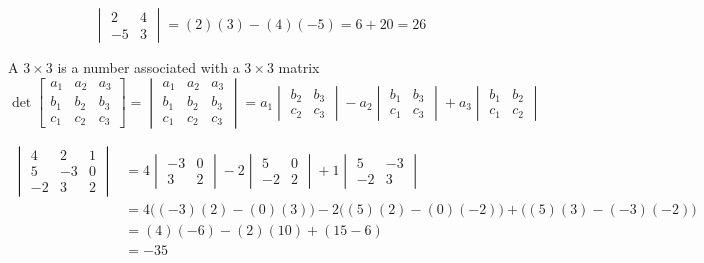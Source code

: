 \documentclass{ximera}
\begin{document}
\begin{example} \label{ex:twodetcrossprod}
$$\begin{vmatrix}
2 & 4\\
-5 & 3
\end{vmatrix} =(2)(3)-(4)(-5)=6+20=26$$
\end{example}
 
\begin{definition}\label{def:threedetcrossprod}
A $3\times 3$  is a number associated with a $3\times 3$ matrix
$$\det{\begin{bmatrix}
a_1 & a_2 & a_3\\
b_1 & b_2 &b_3\\
c_1 &c_2 &c_3
\end{bmatrix}}=
\begin{vmatrix}
a_1 & a_2 & a_3\\
b_1 & b_2 &b_3\\
c_1 &c_2 &c_3
\end{vmatrix} =a_1
\begin{vmatrix}
b_2 & b_3\\
c_2 & c_3
\end{vmatrix} -a_2
\begin{vmatrix}
b_1 & b_3\\
c_1 & c_3
\end{vmatrix} +a_3
\begin{vmatrix}
b_1 & b_2\\
c_1 & c_2
\end{vmatrix}
$$
\end{definition}
 
\begin{example} \label{ex:threedetcrossprod}
\begin{align*}
\begin{vmatrix}
4 & 2 & 1\\
5 & -3 &0\\
-2 &3 &2
\end{vmatrix}&=4
\begin{vmatrix}
-3 & 0\\
3 & 2
\end{vmatrix} -2
\begin{vmatrix}
5 & 0\\
-2 & 2
\end{vmatrix} +1
\begin{vmatrix}
5 & -3\\
-2 & 3
\end{vmatrix}\\
&=4\Big ((-3)(2)-(0)(3)\Big)-2\Big((5)(2)-(0)(-2)\Big)+\Big((5)(3)-(-3)(-2)\Big)\\
&=(4)(-6)-(2)(10)+(15-6)\\
&=-35
\end{align*}
\end{example}
 
\end{document}

